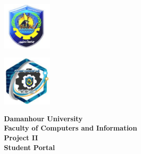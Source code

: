 \documentclass[12pt]{report}
\begin{document}

\begin{titlepage}
    \thispagestyle{empty}

    \begin{minipage}{0.49\textwidth}
        \raggedright
        \includegraphics[width=2.5cm]{images/university_logo.png}
    \end{minipage}
    \begin{minipage}{0.49\textwidth}
        \raggedleft
        \includegraphics[width=2.5cm]{images/faculty_logo.png}
    \end{minipage}

    \vspace{2cm}

    \begin{center}
        {\LARGE \textbf{Damanhour University}}\\[0.5em]
        {\Large \textbf{Faculty of Computers and Information}}\\[1.5cm]

        {\Large \textbf{Project II}}\\[0.5em]
        {\Huge \textbf{Student Portal}}\\[1.5cm]


\end{center}
\end{titlepage}
\end{document}
